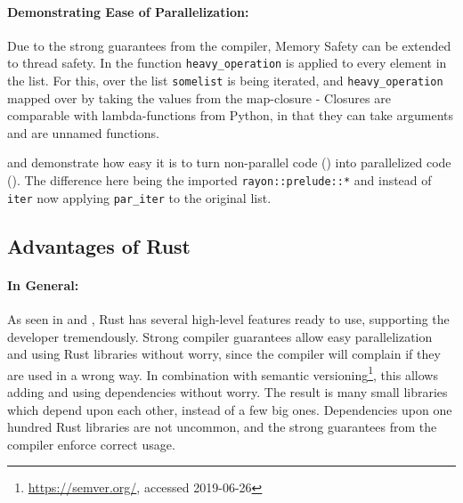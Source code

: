 

\paragraph{Demonstrating Ease of Parallelization:}\label{demo:par}

Due to the strong guarantees from the compiler, Memory Safety can be extended
to thread safety. In  the function \verb|heavy_operation| is
applied to every element in the list. For this, over the list \verb|somelist|
is being iterated, and \verb|heavy_operation| mapped over by taking the values
from the map-closure - Closures are comparable with lambda-functions from
Python, in that they can take arguments and are unnamed functions.

 and  demonstrate how easy it is to turn
non-parallel code () into parallelized code ().
The difference here being the imported \verb|rayon::prelude::*| and instead of
\verb|iter| now applying \verb|par_iter| to the original list.





\subsection{Advantages of Rust}\label{sec:RustAdvantages}


\paragraph{In General:} As seen in  and
, Rust has several high-level features ready to use,
supporting the developer tremendously. Strong compiler guarantees allow easy
parallelization and using Rust libraries without worry, since the compiler will
complain if they are used in a wrong way. In combination with semantic
versioning\footnote{\url{https://semver.org/}, accessed 2019-06-26}, this
allows adding and using dependencies without worry. The result is many small
libraries which depend upon each other, instead of a few big ones. Dependencies
upon one hundred Rust libraries are not uncommon, and the strong guarantees
from the compiler enforce correct usage.

